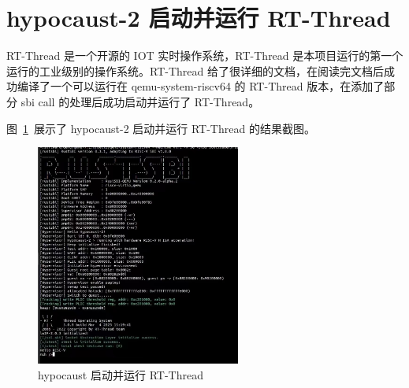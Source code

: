 \section{hypocaust-2 启动并运行 RT-Thread}
RT-Thread 是一个开源的 IOT 实时操作系统，RT-Thread 是本项目运行的第一个运行的工业级别的操作系统。RT-Thread 给了很详细的文档，在阅读完文档后成功编译了一个可以运行在 qemu-system-riscv64 的 RT-Thread 版本，在添加了部分 sbi call 的处理后成功启动并运行了 RT-Thread。

图~\ref{fig:hypocaust-2-rt-thread}~展示了 hypocaust-2 启动并运行 RT-Thread 的结果截图。

\begin{figure}[]
    \centering
    \includegraphics[width=0.6\textwidth]{thesis-images/hypocaust-2-rt-thread.jpeg}
    \caption{hypocaust 启动并运行 RT-Thread}\label{fig:hypocaust-2-rt-thread}
\end{figure}


